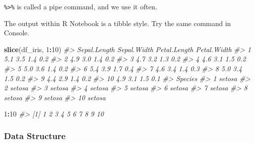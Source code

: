 \documentclass[
  xelatex, ja=standard]{bxjsbook}
\newenvironment{Shaded}{\begin{snugshade}}{\end{snugshade}}
\newcommand{\CommentTok}[1]{\textcolor[rgb]{0.56,0.35,0.01}{\textit{#1}}}
\newcommand{\DecValTok}[1]{\textcolor[rgb]{0.00,0.00,0.81}{#1}}
\newcommand{\FunctionTok}[1]{\textcolor[rgb]{0.13,0.29,0.53}{\textbf{#1}}}
\newcommand{\NormalTok}[1]{#1}
\newcommand{\SpecialCharTok}[1]{\textcolor[rgb]{0.81,0.36,0.00}{\textbf{#1}}}
\theoremstyle{definition}
\theoremstyle{definition}
\theoremstyle{definition}
\theoremstyle{definition}
\theoremstyle{remark}
\begin{document}
\texttt{\%\textgreater{}\%} is called a pipe command, and we use it often.

The output within R Notebook is a tibble style. Try the same command in Console.

\begin{Shaded}
\begin{Highlighting}[]
\FunctionTok{slice}\NormalTok{(df\_iris, }\DecValTok{1}\SpecialCharTok{:}\DecValTok{10}\NormalTok{)}
\CommentTok{\#\textgreater{}    Sepal.Length Sepal.Width Petal.Length Petal.Width}
\CommentTok{\#\textgreater{} 1           5.1         3.5          1.4         0.2}
\CommentTok{\#\textgreater{} 2           4.9         3.0          1.4         0.2}
\CommentTok{\#\textgreater{} 3           4.7         3.2          1.3         0.2}
\CommentTok{\#\textgreater{} 4           4.6         3.1          1.5         0.2}
\CommentTok{\#\textgreater{} 5           5.0         3.6          1.4         0.2}
\CommentTok{\#\textgreater{} 6           5.4         3.9          1.7         0.4}
\CommentTok{\#\textgreater{} 7           4.6         3.4          1.4         0.3}
\CommentTok{\#\textgreater{} 8           5.0         3.4          1.5         0.2}
\CommentTok{\#\textgreater{} 9           4.4         2.9          1.4         0.2}
\CommentTok{\#\textgreater{} 10          4.9         3.1          1.5         0.1}
\CommentTok{\#\textgreater{}    Species}
\CommentTok{\#\textgreater{} 1   setosa}
\CommentTok{\#\textgreater{} 2   setosa}
\CommentTok{\#\textgreater{} 3   setosa}
\CommentTok{\#\textgreater{} 4   setosa}
\CommentTok{\#\textgreater{} 5   setosa}
\CommentTok{\#\textgreater{} 6   setosa}
\CommentTok{\#\textgreater{} 7   setosa}
\CommentTok{\#\textgreater{} 8   setosa}
\CommentTok{\#\textgreater{} 9   setosa}
\CommentTok{\#\textgreater{} 10  setosa}
\end{Highlighting}
\end{Shaded}

\begin{Shaded}
\begin{Highlighting}[]
\DecValTok{1}\SpecialCharTok{:}\DecValTok{10}
\CommentTok{\#\textgreater{}  [1]  1  2  3  4  5  6  7  8  9 10}
\end{Highlighting}
\end{Shaded}

\hypertarget{data-structure}{%
\subsubsection{Data Structure}\label{data-structure}}
\end{document}

